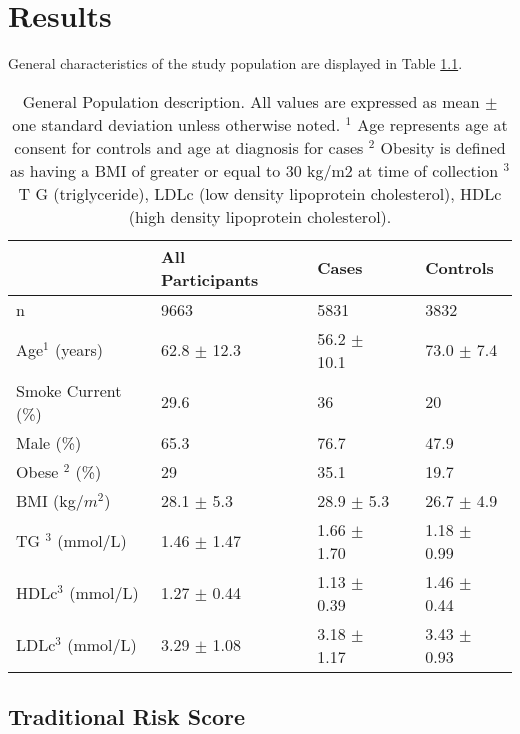 \chapter{Results}


General characteristics of the study population are displayed in Table \ref{pop}.

\begin{table}[bp]
\centering
\begin{tabular}{llllll}
\hline
                   & All Participants &  & Cases       &  & Controls    \\ \hline
n                  & 9663             &  & 5831        &  & 3832        \\
Age$^1$ (years)       & 62.8 $\pm$ 12.3      &  & 56.2 $\pm$ 10.1 &  & 73.0 $\pm$ 7.4  \\
Smoke Current (\%) & 29.6             &  & 36          &  & 20          \\
Male (\%)          & 65.3             &  & 76.7        &  & 47.9        \\
Obese $^2$ (\%)       & 29               &  & 35.1        &  & 19.7        \\
BMI (kg/$m^2$)        & 28.1 $\pm$ 5.3       &  & 28.9 $\pm$ 5.3  &  & 26.7 $\pm$ 4.9  \\
TG $^3$ (mmol/L)      & 1.46 $\pm$ 1.47      &  & 1.66 $\pm$ 1.70 &  & 1.18 $\pm$ 0.99 \\
HDLc$^3$ (mmol/L)     & 1.27 $\pm$ 0.44      &  & 1.13 $\pm$ 0.39 &  & 1.46 $\pm$ 0.44 \\
LDLc$^3$ (mmol/L)     & 3.29 $\pm$ 1.08      &  & 3.18 $\pm$ 1.17 &  & 3.43 $\pm$ 0.93 \\ \hline
\end{tabular}
\caption{General Population description. All values are expressed as mean $\pm$ one standard deviation unless otherwise noted. $^1$  Age represents age at consent for controls and age at diagnosis for cases
 $^2$ Obesity is defined as having a BMI of greater or equal to 30 kg/m2 at time of collection $^3$T G (triglyceride), LDLc (low density lipoprotein cholesterol), HDLc (high density lipoprotein cholesterol).}
\label{pop}
\end{table}


\section{Traditional Risk Score}

 
